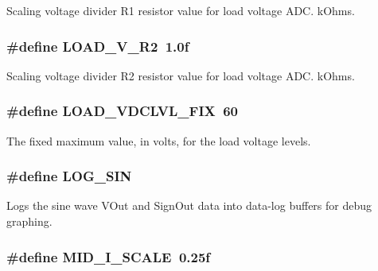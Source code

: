 Scaling voltage divider R1 resistor value for load voltage A\-D\-C. k\-Ohms. \hypertarget{a00043_a4717dea7b1bd4cf2cfcd40ad8a8b2637}{
\subsubsection[{L\-O\-A\-D\-\_\-\-V\-\_\-\-R2}]{\setlength{\rightskip}{0pt plus 5cm}\#define L\-O\-A\-D\-\_\-\-V\-\_\-\-R2~1.\-0f}}\label{a00043_a4717dea7b1bd4cf2cfcd40ad8a8b2637}
Scaling voltage divider R2 resistor value for load voltage A\-D\-C. k\-Ohms. \hypertarget{a00043_ac460f1e706fdf51002f5dfc15c8eb5c9}{
\subsubsection[{L\-O\-A\-D\-\_\-\-V\-D\-C\-L\-V\-L\-\_\-\-F\-I\-X}]{\setlength{\rightskip}{0pt plus 5cm}\#define L\-O\-A\-D\-\_\-\-V\-D\-C\-L\-V\-L\-\_\-\-F\-I\-X~60}}\label{a00043_ac460f1e706fdf51002f5dfc15c8eb5c9}
The fixed maximum value, in volts, for the load voltage levels. \hypertarget{a00043_a95a028761977fbb3ad254501f0d9bf22}{
\subsubsection[{L\-O\-G\-\_\-\-S\-I\-N}]{\setlength{\rightskip}{0pt plus 5cm}\#define L\-O\-G\-\_\-\-S\-I\-N}}\label{a00043_a95a028761977fbb3ad254501f0d9bf22}
Logs the sine wave V\-Out and Sign\-Out data into data-\/log buffers for debug graphing. \hypertarget{a00043_a01632f54fd9c0f7d53a0e5c3fdc7c6e2}{
\subsubsection[{M\-I\-D\-\_\-\-I\-\_\-\-S\-C\-A\-L\-E}]{\setlength{\rightskip}{0pt plus 5cm}\#define M\-I\-D\-\_\-\-I\-\_\-\-S\-C\-A\-L\-E~0.\-25f}}\label{a00043_a01632f54fd9c0f7d53a0e5c3fdc7c6e2}
